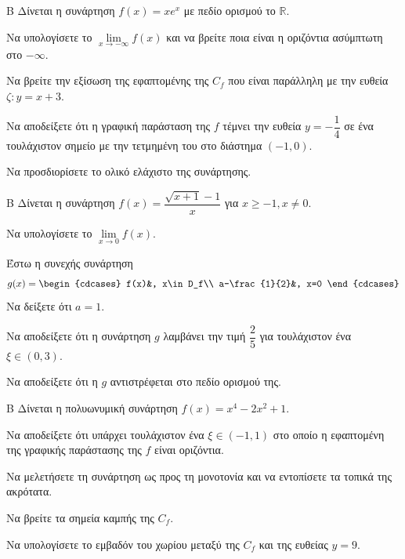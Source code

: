\begin{thema}{Β}
Δίνεται η συνάρτηση $f(x) = x e^x$ με πεδίο ορισμού το $\mathbb{R}$.
\begin{erwthma}
\item Να υπολογίσετε το $\lim\limits_{x \to -\infty} f(x)$ και να βρείτε ποια είναι η οριζόντια ασύμπτωτη στο $-\infty$.
\item Να βρείτε την εξίσωση της εφαπτομένης της $C_f$ που είναι παράλληλη με την ευθεία $\zeta: y=x+3$.
\item Να αποδείξετε ότι η γραφική παράσταση της $f$ τέμνει την ευθεία $y = -\dfrac{1}{4}$ σε ένα τουλάχιστον σημείο με την τετμημένη του στο διάστημα $(-1, 0)$.
\item Να προσδιορίσετε το ολικό ελάχιστο της συνάρτησης.
\end{erwthma}
\end{thema}

\begin{thema}{Β}
Δίνεται η συνάρτηση $f(x) = \dfrac{\sqrt{x+1}-1}{x}$ για $x \ge -1, x \ne 0$.
\begin{erwthma}
\item Να υπολογίσετε το $\lim\limits_{x \to 0} f(x)$.
\item Έστω η συνεχής συνάρτηση
\[g(x)=\begin{cdcases}
f(x)&, x\in D_f\\ a-\frac{1}{2}&, x=0
\end{cdcases}\]
Να δείξετε ότι $a=1$.
\item Να αποδείξετε ότι η συνάρτηση $g$ λαμβάνει την τιμή $\dfrac{2}{5}$ για τουλάχιστον ένα $\xi \in (0, 3)$.
\item Να αποδείξετε ότι η $g$ αντιστρέφεται στο πεδίο ορισμού της.
\end{erwthma}
\end{thema}

\begin{thema}{Β}
Δίνεται η πολυωνυμική συνάρτηση $f(x) = x^4 - 2x^2 + 1$.
\begin{erwthma}
\item Να αποδείξετε ότι υπάρχει τουλάχιστον ένα $\xi \in (-1, 1)$ στο οποίο η εφαπτομένη της γραφικής παράστασης της $f$ είναι οριζόντια.
\item Να μελετήσετε τη συνάρτηση ως προς τη μονοτονία και να εντοπίσετε τα τοπικά της ακρότατα.
\item Να βρείτε τα σημεία καμπής της $C_f$.
\item Να υπολογίσετε το εμβαδόν του χωρίου μεταξύ της $C_f$ και της ευθείας $y=9$.
\end{erwthma}
\end{thema}

